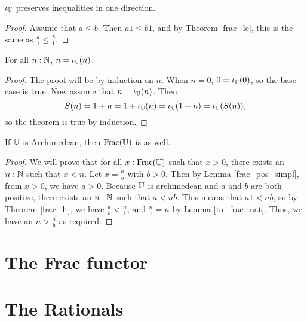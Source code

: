 \documentclass[../../math.tex]{subfiles}
\begin{document}
\begin{instance}
    $\iota_{\mathbb{U}}$ preserves inequalities in one direction.
\end{instance}
\begin{proof}
    Assume that $a \leq b$.  Then $a1 \leq b1$, and by Theorem \ref{frac_le},
    this is the same as $\frac{a}{1} \leq \frac{b}{1}$.
\end{proof}

\begin{lemma} \label{to_frac_nat}
    For all $n : \mathbb{N}$, $n = \iota_{\mathbb{U}}(n)$.
\end{lemma}
\begin{proof}
    The proof will be by induction on $n$.  When $n = 0$, $0 = \iota_{\mathbb{U}}(0)$, so
    the base case is true.  Now assume that $n = \iota_{\mathbb{U}}(n)$.  Then
    \[
        S(n) = 1 + n = 1 + \iota_{\mathbb{U}}(n) = \iota_{\mathbb{U}}(1 + n) = \iota_{\mathbb{U}}(S(n)),
    \]
    so the theorem is true by induction.
\end{proof}

\begin{instance}
    If $\mathbb{U}$ is Archimedean, then $\operatorname{Frac}(\mathbb{U})$ is as well.
\end{instance}
\begin{proof}
    We will prove that for all $x : \operatorname{Frac}(\mathbb{U})$ such that $x > 0$, there exists
    an $n : \mathbb{N}$ such that $x < n$.  Let $x = \frac{a}{b}$ with $b > 0$.  Then by
    Lemma \ref{frac_pos_simpl}, from $x > 0$, we have $a > 0$.  Because $\mathbb{U}$ is
    archimedean and $a$ and $b$ are both positive, there exists an $n : \mathbb{N}$ such
    that $a < nb$.  This means that $a1 < nb$, so by Theorem \ref{frac_lt}, we
    have $\frac{a}{b} < \frac{n}{1}$, and $\frac{n}{1} = n$ by Lemma
    \ref{to_frac_nat}.  Thus, we have an $n > \frac{a}{b}$ as required.
\end{proof}

\section{The Frac functor}

\section{The Rationals}
\end{document}
